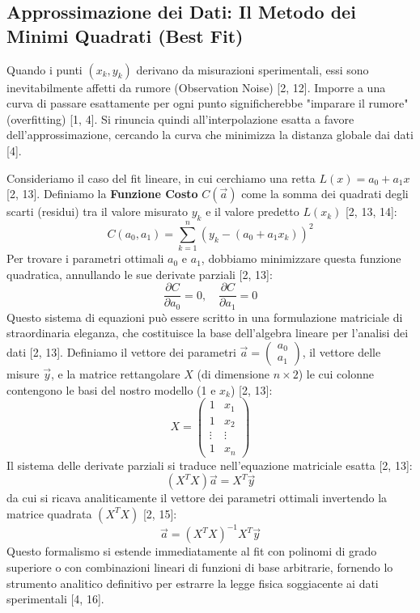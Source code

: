 \documentclass[12pt,a4paper]{article}
\begin{document}
\subsection{Approssimazione dei Dati: Il Metodo dei Minimi Quadrati (Best Fit)}
Quando i punti $(x_k, y_k)$ derivano da misurazioni sperimentali, essi sono inevitabilmente affetti da rumore (Observation Noise) [2, 12]. Imporre a una curva di passare esattamente per ogni punto significherebbe "imparare il rumore" (overfitting) [1, 4]. Si rinuncia quindi all'interpolazione esatta a favore dell'approssimazione, cercando la curva che minimizza la distanza globale dai dati [4].

Consideriamo il caso del fit lineare, in cui cerchiamo una retta $L(x) = a_0 + a_1 x$ [2, 13]. Definiamo la \textbf{Funzione Costo} $C(\vec{a})$ come la somma dei quadrati degli scarti (residui) tra il valore misurato $y_k$ e il valore predetto $L(x_k)$ [2, 13, 14]:
\begin{equation}
C(a_0, a_1) = \sum_{k=1}^n \left( y_k - (a_0 + a_1 x_k) \right)^2
\end{equation}
Per trovare i parametri ottimali $a_0$ e $a_1$, dobbiamo minimizzare questa funzione quadratica, annullando le sue derivate parziali [2, 13]:
\begin{equation}
\frac{\partial C}{\partial a_0} = 0, \quad \frac{\partial C}{\partial a_1} = 0
\end{equation}
Questo sistema di equazioni può essere scritto in una formulazione matriciale di straordinaria eleganza, che costituisce la base dell'algebra lineare per l'analisi dei dati [2, 13]. Definiamo il vettore dei parametri $\vec{a} = \begin{pmatrix} a_0 \\ a_1 \end{pmatrix}$, il vettore delle misure $\vec{y}$, e la matrice rettangolare $X$ (di dimensione $n \times 2$) le cui colonne contengono le basi del nostro modello (1 e $x_k$) [2, 13]:
\begin{equation}
X = \begin{pmatrix}
1 & x_1 \\
1 & x_2 \\
\vdots & \vdots \\
1 & x_n
\end{pmatrix}
\end{equation}
Il sistema delle derivate parziali si traduce nell'equazione matriciale esatta [2, 13]:
\begin{equation}
(X^T X) \vec{a} = X^T \vec{y}
\end{equation}
da cui si ricava analiticamente il vettore dei parametri ottimali invertendo la matrice quadrata $(X^T X)$ [2, 15]:
\begin{equation}
\vec{a} = (X^T X)^{-1} X^T \vec{y}
\end{equation}
Questo formalismo si estende immediatamente al fit con polinomi di grado superiore o con combinazioni lineari di funzioni di base arbitrarie, fornendo lo strumento analitico definitivo per estrarre la legge fisica soggiacente ai dati sperimentali [4, 16].
\end{document}
